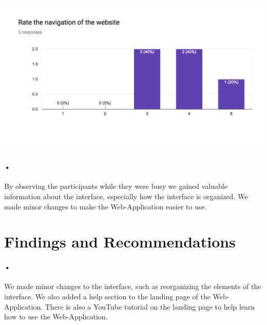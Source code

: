 \documentclass{article}
\begin{document}
	\includegraphics[scale=0.5]{g5}
	
	\paragraph{•}
	By observing the participants while they were busy we gained valuable information about the interface, especially how the interface is organized. We made minor changes to make the Web-Application easier to use. 
	
	\section{Findings and Recommendations}
	\paragraph{•}
	We made minor changes to the interface, such as reorganizing the elements of the interface. We also added a help section to the landing page of the Web-Application. There is also a YouTube tutorial on the landing page to help learn how to use the Web-Application.
	
	

	
	

	
	
\end{document}

